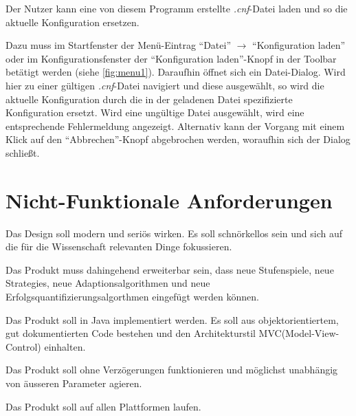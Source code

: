 \documentclass[parskip=full,11pt]{scrartcl}
\begin{document}
Der \Gls{Nutzer} kann eine von diesem Programm erstellte \textit{.cnf}-Datei laden und so die aktuelle Konfiguration ersetzen.

Dazu muss im Startfenster der Menü-Eintrag \enquote{Datei} \(\rightarrow\) \enquote{Konfiguration laden} oder im Konfigurationsfenster der \enquote{Konfiguration laden}-Knopf in der Toolbar betätigt werden (siehe \cref{fig:menu1}). Daraufhin öffnet sich ein Datei-Dialog. Wird hier zu einer gültigen \textit{.cnf}-Datei navigiert und diese ausgewählt, so wird die aktuelle Konfiguration durch die in der geladenen Datei spezifizierte Konfiguration ersetzt. Wird eine ungültige Datei ausgewählt, wird eine entsprechende Fehlermeldung angezeigt. Alternativ kann der Vorgang mit einem Klick auf den \enquote{Abbrechen}-Knopf abgebrochen werden, woraufhin sich der Dialog schließt.

\section{Nicht-Funktionale Anforderungen}


Das Design soll modern und seriös wirken. Es soll schnörkellos sein und sich auf die für die Wissenschaft relevanten Dinge fokussieren.


Das Produkt muss dahingehend erweiterbar sein,
dass neue Stufenspiele, neue \Glspl{Strategie}, neue Adaptionsalgorithmen und neue Erfolgsquantifizierungsalgorthmen eingefügt werden können.


Das Produkt soll in Java implementiert werden. Es soll aus objektorientiertem, gut dokumentierten Code bestehen und den Architekturstil MVC(Model-View-Control) einhalten.


Das Produkt soll ohne Verzögerungen funktionieren und möglichst unabhängig von äusseren Parameter agieren.


Das Produkt soll auf allen Plattformen laufen.

\end{document}

